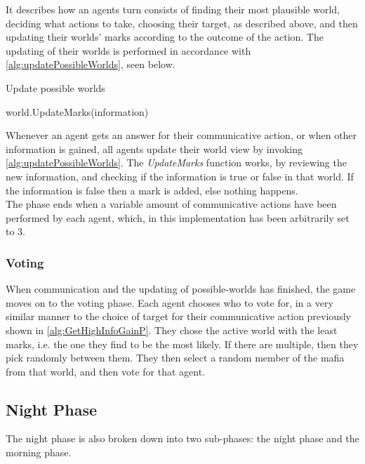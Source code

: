\setcounter{algorithmcaption}{5}
It describes how an agents turn consists of finding their most plausible world,
deciding what actions to take, choosing their target, as described above, and
then updating their worlds' marks according to the outcome of the action.
The updating of their worlds is performed in accordance with
\cref{alg:updatePossibleWorlds}, seen below.
\begin{algorithm}[H]
	\caption{Update possible worlds}
	\begin{algorithmic}[1]
		\State world.UpdateMarks(information)
		\EndFor
		\EndFor
		\EndFunction
	\end{algorithmic}\label{alg:updatePossibleWorlds}
\end{algorithm}
\setcounter{algorithmcaption}{6}
Whenever an agent gets an answer for their communicative action, or when other information is gained, all agents update their
world view by invoking \cref{alg:updatePossibleWorlds}. The \textit{UpdateMarks} function works, by reviewing the new information, and checking if the information is true or false in that world. If the information is false then a mark is added, else nothing happens.\\

The phase ends when a variable amount of communicative actions have been
performed by each agent, which, in this implementation has been arbitrarily set
to 3.

\subsubsection{Voting}\label{sec:voting}
When communication and the updating of possible-worlds has finished, the game
moves on to the voting phase. Each agent chooses who to vote for, in a very
similar manner to the choice of target for their communicative action
previously shown in \cref{alg:GetHighInfoGainP}. They chose the active world with the
least marks, i.e. the one they find to be the most likely. If there are
multiple, then they pick randomly between them. They then select a random
member of the mafia from that world, and then vote for that agent.

\subsection{Night Phase}\label{sec:nightPhase}
The night phase is also broken down into two sub-phases: the night phase and
the morning phase.

